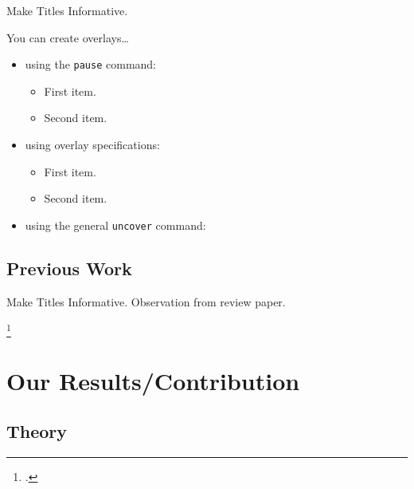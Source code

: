 \documentclass[aspectratio=169]{beamer}
\begin{document}
\begin{frame}{Make Titles Informative.}

    You can create overlays\dots
    \begin{itemize}
        \item using the \texttt{pause} command:
              \begin{itemize}
                  \item
                        First item.
                        \pause
                  \item
                        Second item.
              \end{itemize}
        \item
              using overlay specifications:
              \begin{itemize}
                  \item<3->
                      First item.
                  \item<4->
                      Second item.
              \end{itemize}
        \item
              using the general \texttt{uncover} command:
              \begin{itemize}
              \end{itemize}
    \end{itemize}
\end{frame}


\subsection{Previous Work}

\begin{frame}{Make Titles Informative.}
    Observation from review paper. \footnotemark[1]
    \addtocounter{footnote}{1}
    \footcitetext[1]{alvesNumericalMethods2021}
\end{frame}


\section{Our Results/Contribution}

\subsection{Theory}
\end{document}
